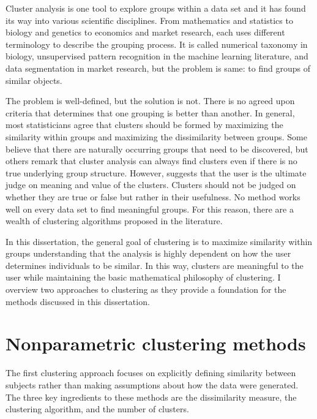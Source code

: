 Cluster analysis is one tool to explore groups within a data set and it has found its way into various scientific disciplines. From mathematics and statistics to biology and genetics to economics and market research, each uses different terminology to describe the grouping process. It is called numerical taxonomy in biology, unsupervised pattern recognition in the machine learning literature, and data segmentation in market research, but the problem is same: to find groups of similar objects.
 
The problem is well-defined, but the solution is not. There is no agreed upon criteria that determines that one grouping is better than another. In general, most statisticians agree that clusters should be formed by maximizing the similarity within groups and maximizing the dissimilarity between groups. Some believe that there are naturally occurring groups that need to be discovered, but others remark that cluster analysis can always find clusters even if there is no true underlying group structure. However, \textcite{bonner1964} suggests that the user is the ultimate judge on meaning and value of the clusters. Clusters should not be judged on whether they are true or false but rather in their usefulness. No method works well on every data set to find meaningful groups. For this reason, there are a wealth of clustering algorithms proposed in the literature. 

In this dissertation, the general goal of clustering is to maximize similarity within groups understanding that the analysis is highly dependent on how the user determines individuals to be similar. In this way, clusters are meaningful to the user while maintaining the basic mathematical philosophy of clustering.  I overview two approaches to clustering as they provide a foundation for the methods discussed in this dissertation. 

\section{Nonparametric clustering methods}\label{sec:nonpar}
The first clustering approach focuses on explicitly defining similarity between subjects rather than making assumptions about how the data were generated. The three key ingredients to these methods are the dissimilarity measure, the clustering algorithm, and the number of clusters.

